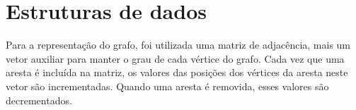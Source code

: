 \section{Estruturas de dados}
\label{sec:estruturas}

Para a representação do grafo, foi utilizada uma matriz de adjacência,
mais um vetor auxiliar para manter o grau de cada vértice do grafo.
Cada vez que uma aresta é incluída na matriz, os valores das posições
dos vértices da aresta neste vetor são incrementadas. Quando uma
aresta é removida, esses valores são decrementados.
